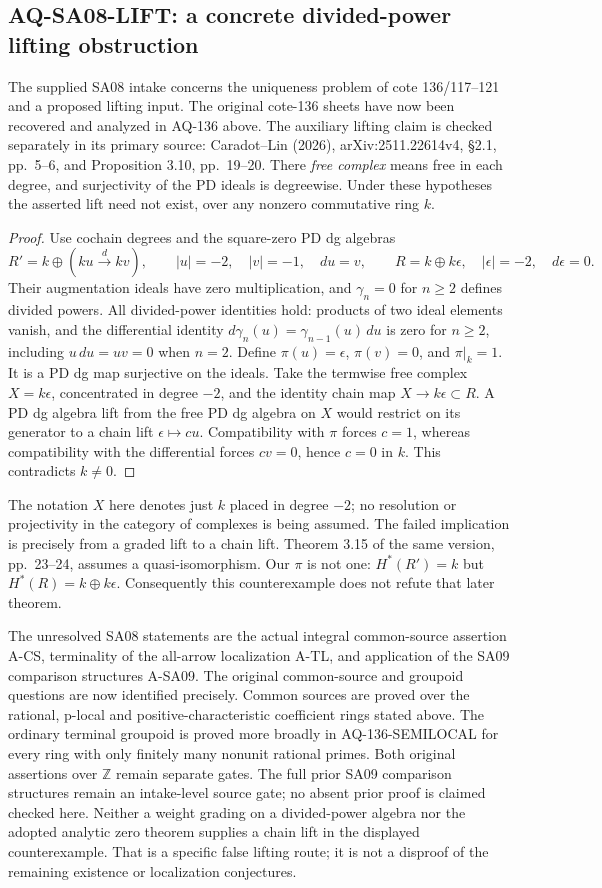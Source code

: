 \subsection{AQ-SA08-LIFT: a concrete divided-power lifting obstruction}
The supplied SA08 intake concerns the uniqueness problem
of cote 136/117--121 and a proposed lifting input.
The original cote-136 sheets have now been recovered and
analyzed in AQ-136 above.  The auxiliary lifting claim
is checked separately in its primary source: Caradot--Lin (2026),
arXiv:2511.22614v4, \S2.1, pp.~5--6, and
Proposition 3.10, pp.~19--20.
There \emph{free complex} means free in each degree,
and surjectivity of the PD ideals is degreewise.
Under these hypotheses the asserted lift need not exist,
over any nonzero commutative ring $k$.
\begin{proof}
Use cochain degrees and the square-zero PD dg algebras
\[
 R'=k\oplus(ku\xrightarrow{\,d\,}kv),\qquad
 |u|=-2,\quad |v|=-1,\quad du=v,
 \qquad R=k\oplus k\epsilon,\quad|\epsilon|=-2,\quad d\epsilon=0.
\]
Their augmentation ideals have zero multiplication,
and $\gamma_n=0$ for $n\geq2$ defines divided powers.
All divided-power identities hold: products of two
ideal elements vanish, and the differential identity
$d\gamma_n(u)=\gamma_{n-1}(u)\,du$ is zero for $n\geq2$,
including $u\,du=uv=0$ when $n=2$.
Define $\pi(u)=\epsilon$, $\pi(v)=0$, and $\pi|_k=1$.
It is a PD dg map surjective on the ideals.
Take the termwise free complex $X=k\epsilon$,
concentrated in degree $-2$, and the identity chain
map $X\to k\epsilon\subset R$.
A PD dg algebra lift from the free PD dg algebra
on $X$ would restrict on its generator to a chain
lift $\epsilon\mapsto cu$.
Compatibility with $\pi$ forces $c=1$, whereas
compatibility with the differential forces $cv=0$,
hence $c=0$ in $k$. This contradicts $k\ne0$.
\end{proof}
The notation $X$ here denotes just $k$ placed in
degree $-2$; no resolution or projectivity in the
category of complexes is being assumed.
The failed implication is precisely from a graded
lift to a chain lift. Theorem 3.15 of the same
version, pp.~23--24, assumes a quasi-isomorphism.
Our $\pi$ is not one:
$H^*(R')=k$ but $H^*(R)=k\oplus k\epsilon$.
Consequently this counterexample does not refute
that later theorem.

The unresolved SA08 statements are the actual
integral common-source assertion A-CS, terminality
of the all-arrow localization A-TL, and application
of the SA09 comparison structures A-SA09.
The original common-source and groupoid questions are now
identified precisely. Common sources are proved over the
rational, p-local and positive-characteristic coefficient
rings stated above. The ordinary terminal groupoid is proved
more broadly in AQ-136-SEMILOCAL for every ring with only
finitely many nonunit rational primes. Both original assertions
over $\mathbb Z$ remain separate gates. The full prior SA09
comparison structures remain an intake-level source gate;
no absent prior proof is claimed checked here.
Neither a weight grading on a divided-power algebra
nor the adopted analytic zero theorem supplies a
chain lift in the displayed counterexample.
That is a specific false lifting route; it is not
a disproof of the remaining existence or
localization conjectures.


